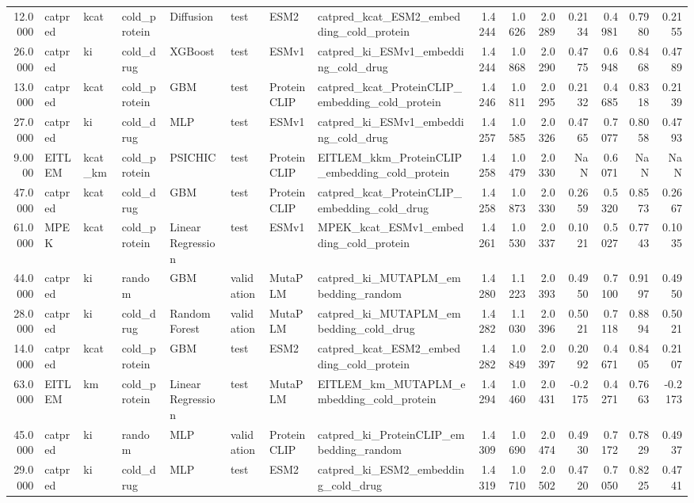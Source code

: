 \begin{tabular}{rlllllllrrrrrrr}
12.0000 & catpred & kcat & cold_protein & Diffusion & test & ESM2 & catpred_kcat_ESM2_embedding_cold_protein & 1.4244 & 1.0626 & 2.0289 & 0.2134 & 0.4981 & 0.7980 & 0.2155 \\
26.0000 & catpred & ki & cold_drug & XGBoost & test & ESMv1 & catpred_ki_ESMv1_embedding_cold_drug & 1.4244 & 1.0868 & 2.0290 & 0.4775 & 0.6948 & 0.8468 & 0.4789 \\
13.0000 & catpred & kcat & cold_protein & GBM & test & ProteinCLIP & catpred_kcat_ProteinCLIP_embedding_cold_protein & 1.4246 & 1.0811 & 2.0295 & 0.2132 & 0.4685 & 0.8318 & 0.2139 \\
27.0000 & catpred & ki & cold_drug & MLP & test & ESMv1 & catpred_ki_ESMv1_embedding_cold_drug & 1.4257 & 1.0585 & 2.0326 & 0.4765 & 0.7077 & 0.8058 & 0.4793 \\
9.0000 & EITLEM & kcat_km & cold_protein & PSICHIC & test & ProteinCLIP & EITLEM_kkm_ProteinCLIP_embedding_cold_protein & 1.4258 & 1.0479 & 2.0330 & NaN & 0.6071 & NaN & NaN \\
47.0000 & catpred & kcat & cold_drug & GBM & test & ProteinCLIP & catpred_kcat_ProteinCLIP_embedding_cold_drug & 1.4258 & 1.0873 & 2.0330 & 0.2659 & 0.5320 & 0.8573 & 0.2667 \\
61.0000 & MPEK & kcat & cold_protein & Linear Regression & test & ESMv1 & MPEK_kcat_ESMv1_embedding_cold_protein & 1.4261 & 1.0530 & 2.0337 & 0.1021 & 0.5027 & 0.7743 & 0.1035 \\
44.0000 & catpred & ki & random & GBM & validation & MutaPLM & catpred_ki_MUTAPLM_embedding_random & 1.4280 & 1.1223 & 2.0393 & 0.4950 & 0.7100 & 0.9197 & 0.4950 \\
28.0000 & catpred & ki & cold_drug & Random Forest & validation & MutaPLM & catpred_ki_MUTAPLM_embedding_cold_drug & 1.4282 & 1.1030 & 2.0396 & 0.5021 & 0.7118 & 0.8894 & 0.5021 \\
14.0000 & catpred & kcat & cold_protein & GBM & test & ESM2 & catpred_kcat_ESM2_embedding_cold_protein & 1.4282 & 1.0849 & 2.0397 & 0.2092 & 0.4671 & 0.8405 & 0.2107 \\
63.0000 & EITLEM & km & cold_protein & Linear Regression & test & MutaPLM & EITLEM_km_MUTAPLM_embedding_cold_protein & 1.4294 & 1.0460 & 2.0431 & -0.2175 & 0.4271 & 0.7663 & -0.2173 \\
45.0000 & catpred & ki & random & MLP & validation & ProteinCLIP & catpred_ki_ProteinCLIP_embedding_random & 1.4309 & 1.0690 & 2.0474 & 0.4930 & 0.7172 & 0.7829 & 0.4937 \\
29.0000 & catpred & ki & cold_drug & MLP & test & ESM2 & catpred_ki_ESM2_embedding_cold_drug & 1.4319 & 1.0710 & 2.0502 & 0.4720 & 0.7050 & 0.8225 & 0.4741 \\

\end{tabular}
